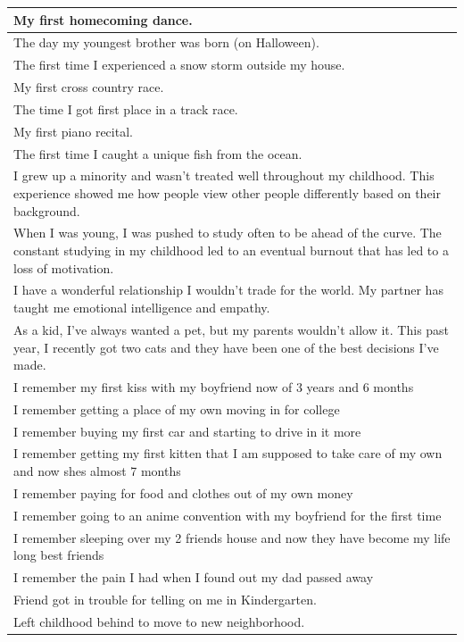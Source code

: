 \documentclass[
  .7em,
  letterpaper,
  DIV=11,
  numbers=noendperiod]{scrartcl}
\begin{document}
\begin{table}
\begin{tabular}{l}
\hline
My first homecoming dance.\\
\hline
The day my youngest brother was born (on Halloween).\\
\hline
The first time I experienced a snow storm outside my house.\\
\hline
My first cross country race.\\
\hline
The time I got first place in a track race.\\
\hline
My first piano recital.\\
\hline
The first time I caught a unique fish from the ocean.\\
\hline
I grew up a minority and wasn't treated well throughout my childhood. This experience showed me how people view other people differently based on their background.\\
\hline
When I was young, I was pushed to study often to be ahead of the curve. The constant studying in my childhood led to an eventual burnout that has led to a loss of motivation.\\
\hline
I have a wonderful relationship I wouldn't trade for the world. My partner has taught me emotional intelligence and empathy.\\
\hline
As a kid, I've always wanted a pet, but my parents wouldn't allow it. This past year, I recently got two cats and they have been one of the best decisions I've made.\\
\hline
I remember my first kiss with my boyfriend now of 3 years and 6 months\\
\hline
I remember getting a place of my own moving in for college\\
\hline
I remember buying my first car and starting to drive in it more\\
\hline
I remember getting my first kitten that I am supposed to take care of my own and now shes almost 7 months\\
\hline
I remember paying for food and clothes out of my own money\\
\hline
I remember going to an anime convention with my boyfriend for the first time\\
\hline
I remember sleeping over my 2 friends house and now they have become my life long best friends\\
\hline
I remember the pain I had when I found out my dad passed away\\
\hline
Friend got in trouble for telling on me in Kindergarten.\\
\hline
Left childhood behind to move to new neighborhood.\\

\end{tabular}
\end{table}
\end{document}
